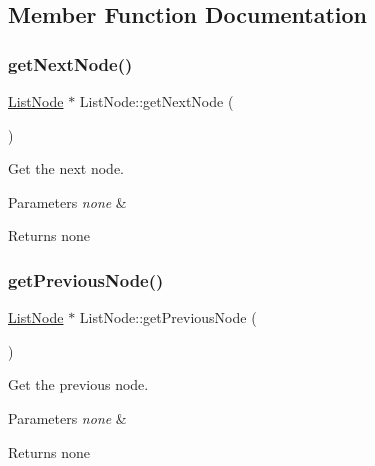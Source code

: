 \subsection{Member Function Documentation}
\mbox{\label{class_list_node_a67d0812638ee0cf0504c4e26300140f4}} 
\subsubsection{\texorpdfstring{get\+Next\+Node()}{getNextNode()}}
{\footnotesize\ttfamily \hyperlink{class_list_node}{List\+Node} $\ast$ List\+Node\+::get\+Next\+Node (\begin{DoxyParamCaption}{ }\end{DoxyParamCaption})}



Get the next node. 


\begin{DoxyParams}{Parameters}
{\em none} & \\
\hline
\end{DoxyParams}
\begin{DoxyReturn}{Returns}
none 
\end{DoxyReturn}
\mbox{\label{class_list_node_ac9da9956959adb42c1208090358b27a9}} 
\subsubsection{\texorpdfstring{get\+Previous\+Node()}{getPreviousNode()}}
{\footnotesize\ttfamily \hyperlink{class_list_node}{List\+Node} $\ast$ List\+Node\+::get\+Previous\+Node (\begin{DoxyParamCaption}{ }\end{DoxyParamCaption})}



Get the previous node. 


\begin{DoxyParams}{Parameters}
{\em none} & \\
\hline
\end{DoxyParams}
\begin{DoxyReturn}{Returns}
none 
\end{DoxyReturn}
\mbox{\label{class_list_node_aea1731114341126c371cd2fa5f674a11}} 
